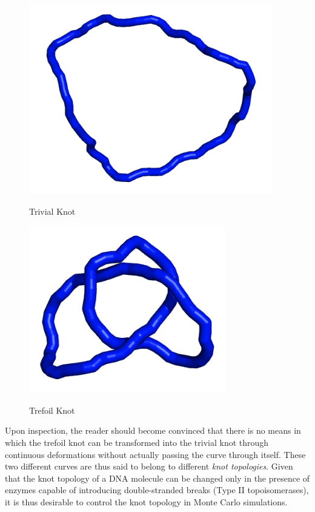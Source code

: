 \documentclass[english]{article}
\begin{document}
\begin{figure}[h]
\centering
\caption{Trivial Knot}
\includegraphics[scale=0.3]{figures/unknot.png}
\label{figure3}
\end{figure}

\begin{figure}[h]
\centering
\caption{Trefoil Knot}

\includegraphics[scale=0.3]{figures/trefoil.png}
\label{figure4}
\end{figure}

Upon inspection, the reader should become convinced that there is no means in which the trefoil knot can be transformed into the trivial knot through continuous deformations without actually passing the curve through itself. These two different curves are thus said to belong to different \emph{knot topologies}. Given that the knot topology of a DNA molecule can be changed only in the presence of enzymes capable of introducing double-stranded breaks (Type II topoisomerases), it is thus desirable to control the knot topology in Monte Carlo simulations.
\end{document}
